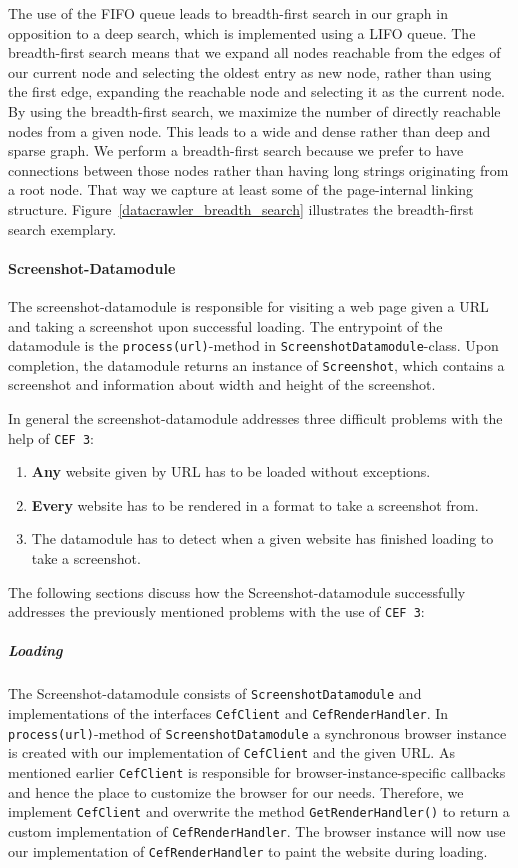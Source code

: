 The use of the FIFO queue leads to breadth-first search in our graph in opposition to a deep search, which is implemented using a LIFO queue. The breadth-first search means that we expand all nodes reachable from the edges of our current node and selecting the oldest entry as new node, rather than using the first edge, expanding the reachable node and selecting it as the current node. By using the breadth-first search, we maximize the number of directly reachable nodes from a given node. This leads to a wide and dense rather than deep and sparse graph. We perform a breadth-first search because we prefer to have connections between those nodes rather than having long strings originating from a root node. That way we capture at least some of the page-internal linking structure. Figure~\ref{datacrawler_breadth_search} illustrates the breadth-first search exemplary.

\paragraph*{Screenshot-Datamodule}
\label{datacrawler_screenshot_datamodule}
The screenshot-datamodule is responsible for visiting a web page given a URL and taking a screenshot upon successful loading. The entrypoint of the datamodule is the \texttt{process(url)}-method in \texttt{ScreenshotDatamodule}-class. Upon completion, the datamodule returns an instance of \texttt{Screenshot}, which contains a screenshot and information about width and height of the screenshot.

In general the screenshot-datamodule addresses three difficult problems with the help of \texttt{CEF 3}: 

\begin{enumerate}
	\item \textbf{Any} website given by URL  has to be loaded without exceptions.
	\item \textbf{Every} website has to be rendered in a format to take a screenshot from.
	\item The datamodule has to detect when a given website has finished loading to take a screenshot.
\end{enumerate}

The following sections discuss how the Screenshot-datamodule successfully addresses the previously mentioned problems with the use of \texttt{CEF 3}:

\subparagraph*{Loading} 
The Screenshot-datamodule consists of \texttt{ScreenshotDatamodule} and implementations of the interfaces \texttt{CefClient} and \texttt{CefRenderHandler}. In \texttt{process(url)}-method of \texttt{ScreenshotDatamodule} a synchronous browser instance is created with our implementation of \texttt{CefClient} and the given URL. As mentioned earlier \texttt{CefClient} is responsible for browser-instance-specific callbacks and hence the place to customize the browser for our needs. Therefore, we implement \texttt{CefClient} and overwrite the method \texttt{GetRenderHandler()} to return a custom implementation of \texttt{CefRenderHandler}. The browser instance will now use our implementation of \texttt{CefRenderHandler} to paint the website during loading.

